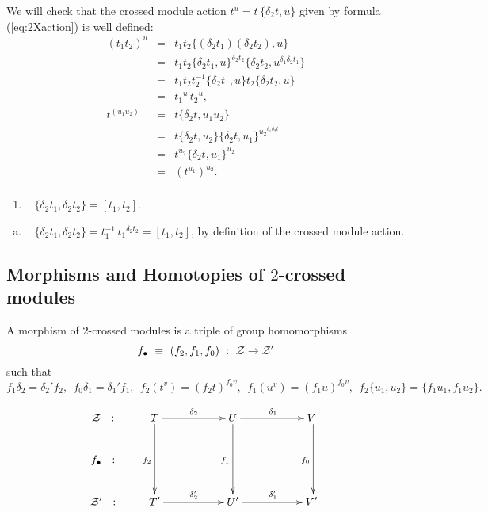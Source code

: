 \medskip\noindent
We will check that the crossed module action  $t^u = t\,\{\delta_2t,u\}$ 
given by formula (\ref{eq:2Xaction}) is well defined:
\begin{eqnarray*}
(t_1t_2)^{u} 
  & = &  t_1 t_2 \{(\delta_2 t_1)(\delta_2 t_2), u \} \\
  & = &  t_1 t_2 \{\delta_2 t_1, u \}^{\delta_2 t_2} 
                 \{\delta_2 t_2, u^{\delta_1 \delta_2 t_1} \} \\
  & = &  t_1 t_2 t_2^{-1} \{\delta_2 t_1, u \}
                 t_2 \{\delta_2 t_2, u\} \\
  & = &  {t_1}^u\,{t_2}^u, \\
t^{(u_1u_2)} 
  & = &  t \{\delta_2 t, u_1u_2 \} \\
  & = &  t \{\delta_2 t,u_2\}\{\delta_2 t, u_1\}^{{u_2}^{\delta_1\delta_2 t}}\\
  & = &  t^{u_2} \{\delta_2 t, u_1\}^{u_2} \\
  & = &  (t^{u_1})^{u_2}. \\
\end{eqnarray*}

\begin{lem} \label{lem:Peiffer-props}
\begin{enumerate}[{\rm (a)}]
\item~
$\{\delta_2t_1,\delta_2t_2\} = [t_1,t_2]$.
\end{enumerate}
\end{lem}
\begin{pf}
\begin{enumerate}[(a)]
\item~
$\{\delta_2t_1,\delta_2t_2\} = t_1^{-1}\,{t_1}^{\delta_2t_2} = [t_1,t_2]$,
by definition of the crossed module action.
\end{enumerate}
\end{pf}


\subsection{Morphisms and Homotopies of $2$-crossed modules} 
\label{subs:morph-homot}

\begin{defn}  
A morphism of $2$-crossed modules is a triple of group homomorphisms
$$
f_{\bullet} ~\equiv~ (f_2, f_1, f_0) ~:~ \cal Z \to \mathcal{Z}'
$$
such that
$$
f_1\delta_2 = \delta_2'f_2,~~
f_0\delta_1 = \delta_1'f_1,~~
f_2(t^v) = (f_2t)^{f_0v},~~
f_1(u^v) = (f_1u)^{f_0v},~~
f_2\{u_1,u_2\} = \{f_1u_1,f_1u_2\}.
$$
\end{defn}
$$
\xymatrix{
\calZ ~~:
  &  T \ar[rr]^{\delta_2} \ar[dd]_{f_2}
     &&  U \ar[rr]^{\delta_1} \ar[dd]_{f_1}
         && V~ \ar[dd]_{f_0} \\
f_{\bullet} ~~:
  &  &&  &&  \\
\calZ' ~~:
  &  T' \ar[rr]^{\delta_2'} 
     &&  U' \ar[rr]^{\delta_1'}
         && V'~ \\
}
$$

